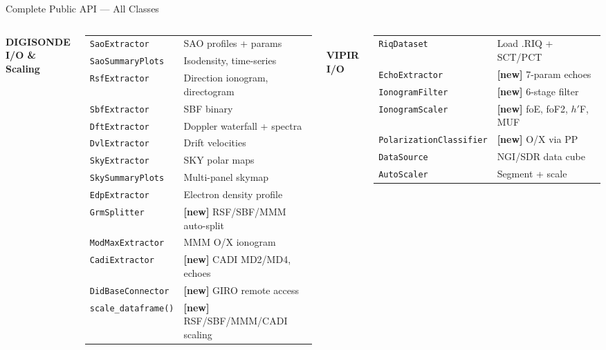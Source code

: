 \documentclass[aspectratio=169,11pt]{beamer}
\begin{document}
\begin{frame}{Complete Public API — All Classes}
\begin{columns}
  \small\textbf{DIGISONDE I/O \& Scaling}\\[2pt]
  \scriptsize
  \begin{tabular}{ll}
    \texttt{SaoExtractor}    & SAO profiles + params \\
    \texttt{SaoSummaryPlots} & Isodensity, time-series \\
    \texttt{RsfExtractor}    & Direction ionogram, directogram \\
    \texttt{SbfExtractor}    & SBF binary \\
    \texttt{DftExtractor}    & Doppler waterfall + spectra \\
    \texttt{DvlExtractor}    & Drift velocities \\
    \texttt{SkyExtractor}    & SKY polar maps \\
    \texttt{SkySummaryPlots} & Multi-panel skymap \\
    \texttt{EdpExtractor}    & Electron density profile \\
    \texttt{GrmSplitter}     & \textbf{[new]} RSF/SBF/MMM auto-split \\
    \texttt{ModMaxExtractor} & MMM O/X ionogram \\
    \texttt{CadiExtractor}   & \textbf{[new]} CADI MD2/MD4, echoes \\
    \texttt{DidBaseConnector} & \textbf{[new]} GIRO remote access \\
    \texttt{scale\_dataframe()} & \textbf{[new]} RSF/SBF/MMM/CADI scaling \\
  \end{tabular}\\[5pt]
  \small\textbf{VIPIR I/O}\\[2pt]
  \scriptsize
  \begin{tabular}{ll}
    \texttt{RiqDataset}     & Load .RIQ + SCT/PCT \\
    \texttt{EchoExtractor}  & \textbf{[new]} 7-param echoes \\
    \texttt{IonogramFilter} & \textbf{[new]} 6-stage filter \\
    \texttt{IonogramScaler} & \textbf{[new]} foE, foF2, $h'$F, MUF \\
    \texttt{PolarizationClassifier} & \textbf{[new]} O/X via PP \\
    \texttt{DataSource}     & NGI/SDR data cube \\
    \texttt{AutoScaler}     & Segment + scale \\

\end{tabular}
\end{columns}
\end{frame}
\end{document}

